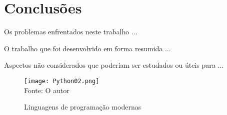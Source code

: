 

\chapter{Conclus\~{o}es}


Os problemas enfrentados neste trabalho ...


O trabalho que foi desenvolvido em forma resumida ...

Aspectos n\~{a}o considerados que poderiam ser estudados ou \'{u}teis para ...



   \begin{figure}[H]
    \begin{center}
        \caption{Linguagens de programa\c{c}\~{a}o modernas} \label{ling2}
        \texttt{[image: Python02.png]} \\
        {\tiny \sf Fonte: O autor }
    \end{center}
   \end{figure} 